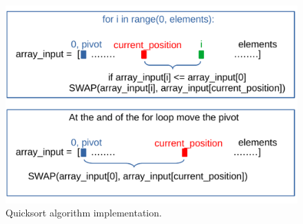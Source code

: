 \begin{figure}[H]
	\begin{center}
		\includegraphics[scale=.6]{chapters/searchandsorting/images/sorting_12.pdf}
		\caption[Quicksort algorithm implementation.]{Quicksort algorithm implementation.}
		\label{sorting_12}
	\end{center}
\end{figure}